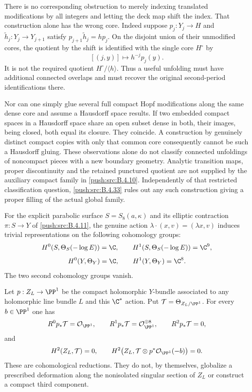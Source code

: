 \begin{remark}
There is no corresponding obstruction to merely indexing translated
modifications by all integers and letting the deck map shift the
index. That construction alone has the wrong core. Indeed suppose
$p_j:Y_j\to H$ and
$\widetilde h_j:Y_j\to Y_{j+1}$ satisfy
$p_{j+1}\widetilde h_j=hp_j$.
On the disjoint union of their unmodified cores, the quotient by
the shift is identified with the single core $H^\circ$ by
\[
 [(j,y)]\longmapsto h^{-j}p_j(y).
\]
It is not the required quotient $H^\circ/\langle h\rangle$.
Thus a useful unfolding must have additional connected overlaps
and must recover the original second-period identifications there.

Nor can one simply glue several full compact Hopf modifications
along the same dense core and assume a Hausdorff space results.
If two embedded compact spaces in a Hausdorff space share an open
subset dense in both, their images, being closed, both equal its
closure. They coincide. A construction by genuinely distinct
compact copies with only that common core consequently cannot be
such a Hausdorff gluing.
These observations alone do not classify connected unfoldings
of noncompact pieces with a new boundary geometry. Analytic
transition maps, proper discontinuity and the retained punctured
quotient are not supplied by the auxiliary compact family in
\ref{push:src:B.4.10}. Independently of that restricted classification question,
\ref{push:src:B.4.33} rules out any such construction giving a proper filling
of the actual global family.
\end{remark}


\begin{proposition}\label{push:src:B.4.14}
For the explicit parabolic surface $S=S_8(a,\kappa)$ and its
elliptic contraction $\pi:S\to Y$ of \ref{push:src:B.4.11}, the genuine action
$\lambda\cdot(x,v)=(\lambda x,v)$ induces trivial representations
on the following cohomology groups:
\[
 H^0(S,\Theta_S(-\log E))=\C,\qquad
 H^1(S,\Theta_S(-\log E))=\C^9,
\]
\[
 H^0(Y,\Theta_Y)=\C,\qquad H^1(Y,\Theta_Y)=\C^8.
\]
The two second cohomology groups vanish.

Let $p:Z_L\to\PP^1$ be the compact holomorphic $Y$-bundle
associated to any holomorphic line bundle $L$ and this
$\C^*$ action.  Put
$\mathcal T=\Theta_{Z_L/\PP^1}$.
For every $b\in\PP^1$ one has
\[
 R^0p_*\mathcal T=\mathcal O_{\PP^1},\qquad
 R^1p_*\mathcal T=\mathcal O_{\PP^1}^{\oplus8},\qquad
 R^2p_*\mathcal T=0,
\]
and
\[
 H^2(Z_L,\mathcal T)=0,
 \qquad
 H^2\bigl(Z_L,\mathcal T\otimes
                   p^*\mathcal O_{\PP^1}(-b)\bigr)=0.
\]
These are cohomological reductions.  They do not, by themselves,
globalize a prescribed deformation along the nonisolated
singular section of $Z_L$ or construct a compact third component.
\end{proposition}

